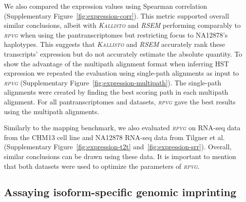 \documentclass[11pt]{ucthesis}
\newcommand{\tool}[1]{\emph{\textsc{#1}}}
\begin{document}
We also compared the expression values using Spearman correlation (Supplementary Figure~\ref{fig:expression-corr}). This metric supported overall similar conclusions, albeit with \tool{Kallisto} and \tool{RSEM} performing comparably to \tool{rpvg} when using the pantranscriptomes but restricting focus to NA12878's haplotypes. This suggests that \tool{Kallisto} and \tool{RSEM} accurately rank these transcripts' expression but do not accurately estimate the absolute quantity.
\newline 
\newline
To show the advantage of the multipath alignment format when inferring HST expression we repeated the evaluation using single-path alignments as input to \tool{rpvg} (Supplementary Figure~\ref{fig:expression-multipath}). The single-path alignments were created by finding the best scoring path in each multipath alignment. For all pantranscriptomes and datasets, \tool{rpvg} gave the best results using the multipath alignments.

Similarly to the mapping benchmark, we also evaluated \tool{rpvg} on RNA-seq data from the CHM13 cell line and NA12878 RNA-seq data from Tilgner et al. \cite{tilgner2014defining} (Supplementary Figure~\ref{fig:expression-t2t} and~\ref{fig:expression-srr}). Overall, similar conclusions can be drawn using these data. It is important to mention that both datasets were used to optimize the parameters of \tool{rpvg}.

\subsection{Assaying isoform-specific genomic imprinting}
\end{document}
